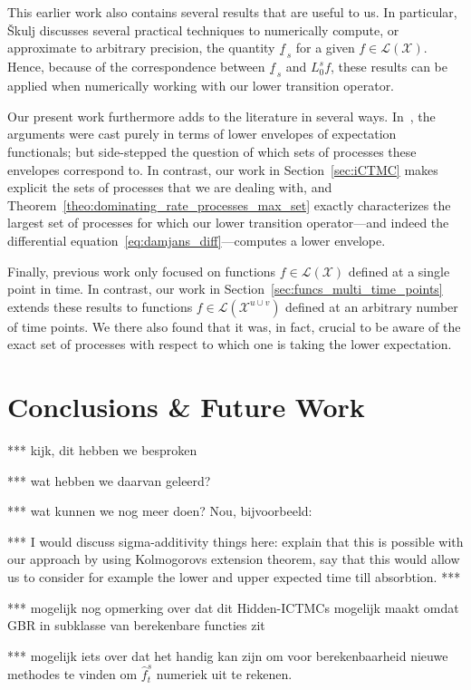 \documentclass[10pt,a4paper]{paper}
\theoremstyle{definition}
\newcommand{\states}{\mathcal{X}}
\newcommand{\gambles}{\mathcal{L}}
\newcommand{\gamblesX}{\gambles(\states)}
\begin{document}
This earlier work also contains several results that are useful to us. In particular, {\v{S}}kulj discusses several practical techniques to numerically compute, or approximate to arbitrary precision, the quantity $\underline{f}_{\,s}$ for a given $f\in\gamblesX$. Hence, because of the correspondence between $\underline{f}_{\,s}$ and $L_0^sf$, these results can be applied when numerically working with our lower transition operator.

Our present work furthermore adds to the literature in several ways. In~\cite{Skulj:2015cq}, the arguments were cast purely in terms of lower envelopes of expectation functionals; but side-stepped the question of which sets of processes these envelopes correspond to. In contrast, our work in Section~\ref{sec:iCTMC} makes explicit the sets of processes that we are dealing with, and Theorem~\ref{theo:dominating_rate_processes_max_set} exactly characterizes the largest set of processes for which our lower transition operator---and indeed the differential equation~\eqref{eq:damjans_diff}---computes a lower envelope.

Finally, previous work only focused on functions $f\in\gamblesX$ defined at a single point in time. In contrast, our work in Section~\ref{sec:funcs_multi_time_points} extends these results to functions $f\in\gambles(\states^{u\cup v})$ defined at an arbitrary number of time points. We there also found that it was, in fact, crucial to be aware of the exact set of processes with respect to which one is taking the lower expectation.

\section{Conclusions \& Future Work}\label{sec:conclusions}

*** kijk, dit hebben we besproken

*** wat hebben we daarvan geleerd?

*** wat kunnen we nog meer doen? Nou, bijvoorbeeld:

*** I would discuss sigma-additivity things here: explain that this is possible with our approach by using Kolmogorovs extension theorem, say that this would allow us to consider for example the lower and upper expected time till absorbtion. ***

*** mogelijk nog opmerking over dat dit Hidden-ICTMCs mogelijk maakt omdat GBR in subklasse van berekenbare functies zit

*** mogelijk iets over dat het handig kan zijn om voor berekenbaarheid nieuwe methodes te vinden om $\hat{f}_t^s$ numeriek uit te rekenen.
\end{document}
